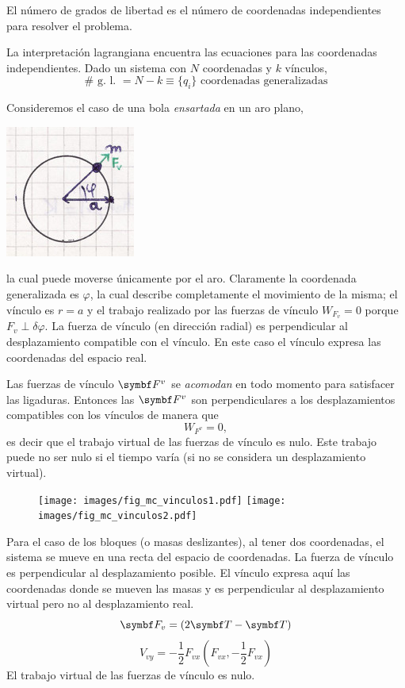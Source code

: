 \documentclass[10pt,oneside]{CBFT_book}
\begin{document}
El número de grados de libertad es el número de coordenadas independientes para resolver el problema.

La interpretación lagrangiana encuentra las ecuaciones para las coordenadas independientes.
Dado un sistema con $N$ coordenadas y $k$ vínculos,
\[
	\# \text{ g. l. } = N - k \equiv \{ q_i \} \text{ coordenadas generalizadas}
\]

Consideremos el caso de una bola {\it ensartada} en un aro plano,

\includegraphics[scale=0.35]{images/fig_mc_bola_ensartada.jpg}

la cual puede moverse únicamente por el aro. Claramente la coordenada generalizada es $\varphi$, la cual
describe completamente el movimiento de la misma; el vínculo es $ r = a $ y el trabajo realizado por las
fuerzas de vínculo $W_{F_v} = 0 $ porque $F_v \perp \delta \varphi$. La fuerza de vínculo (en dirección radial)
es perpendicular al desplazamiento compatible con el vínculo.
En este caso el vínculo expresa las coordenadas del espacio real.

Las fuerzas de vínculo $\vb{F}^v$ se {\it acomodan} en todo momento para satisfacer las ligaduras.
Entonces las $\vb{F}^v$ son perpendiculares a los desplazamientos compatibles con los vínculos de
manera que
\[
	W_{F^v} = 0,
\]
es decir que el trabajo virtual de las fuerzas de vínculo es nulo. Este trabajo puede no ser nulo si el tiempo
varía (si no se considera un desplazamiento virtual).

\begin{figure}[hbt]
	\begin{center}
	\texttt{[image: images/fig\_mc\_vinculos1.pdf]}
	\texttt{[image: images/fig\_mc\_vinculos2.pdf]}
	\end{center}
	\caption{}
\end{figure}


Para el caso de los bloques (o masas deslizantes), al tener dos coordenadas, el sistema se mueve en una recta del espacio de coordenadas.
La fuerza de vínculo es perpendicular al desplazamiento posible.
El vínculo expresa aquí las coordenadas donde se mueven las masas y es perpendicular al desplazamiento virtual pero no al desplazamiento real.
\[
	\vb{F}_v = (2\vb{T}-\vb{T})
\]
\[
	V_{vy} = - \frac 1 2 F_{vx} (F_{vx},-\frac 1 2 F_{vx})
\]
El trabajo virtual de las fuerzas de vínculo es nulo.
\end{document}
